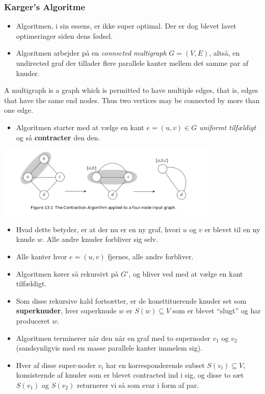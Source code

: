 \documentclass{beamer}
\begin{document}
\begin{frame}[allowframebreaks]
  \frametitle{Karger's Algoritme}
\begin{itemize}
\item Algoritmen, i sin essens, er ikke super optimal. Der er dog blevet lavet optimeringer siden dens fødsel.
\item Algoritmen arbejder på en \textit{connected multigraph} $G = (V,E)$, altså, en undirected graf der tillader flere parallele kanter mellem det samme par af knuder.
\end{itemize}  
\begin{definition}
A multigraph is a graph which is permitted to have multiple edges, that is, edges that have the same end nodes. Thus two vertices may be connected by more than one edge.
\end{definition}
\begin{itemize}
\item Algoritmen starter med at vælge en kant $e = (u,v) \in G$ \textit{uniformt tilfældigt} og så \textbf{contracter} den den. 
\end{itemize}
\begin{center}
    \includegraphics[width=300pt]{main-b690.png}
\end{center}
\begin{itemize}
\item Hvad dette betyder, er at der nu er en ny graf, hvori $u$ og $v$ er blevet til en ny knude $w$. Alle andre knuder forbliver sig selv. 
\item Alle kanter hvor $e = (u,v)$ fjernes, alle andre forbliver.
\item Algoritmen kører så rekursivt på $G'$, og bliver ved med at vælge en kant tilfældigt. 
\item Som disse rekursive kald fortsætter, er de konsttituerende knuder set som \textbf{superknuder}, hver superknude $w$ er $S(w) \subseteq V$ som er blevet ``slugt'' og har produceret $w$. 
\item Algoritmen terminerer når den når en graf med to supernoder $v_{1}$ og $v_{2}$ (sandsynligvis med en masse parallele kanter immelem sig).
\item Hver af disse super-noder $v_{i}$ har en korresponderende subset $S(v_{i}) \subseteq V$, konsisternde af knuder som er blevet contracted ind i sig, og disse to sæt $S(v_{1})$ og $S(v_{2})$ returnerer vi så som svar i form af par. 

\end{itemize}
\end{frame}
\end{document}
